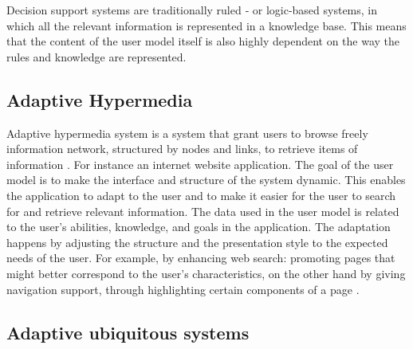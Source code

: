 Decision support systems are traditionally ruled ‐ or logic-based systems, in
which all the relevant information is represented in a knowledge base. This
means that the content of the user model itself is also highly dependent on the
way the rules and knowledge are represented.


\subsection{Adaptive Hypermedia}

Adaptive hypermedia system is a system that grant users to browse freely information
network,  structured by nodes and links, to retrieve items of information \cite{deepa2012adaptive}. For instance an internet website application.
The goal of the user model is to make the interface and structure of the system
dynamic. This enables the application to adapt to the user and to make it easier
for the user to search for and retrieve relevant information.  The data used in
the user model is related to the user’s abilities, knowledge, and goals in the
application. The adaptation happens by adjusting the structure and the
presentation style to the expected needs of the user. For example, by enhancing
web search: promoting pages that might better correspond to the user’s
characteristics, on the other hand by giving navigation support, through
highlighting certain components of a page \cite{razmerita2012user}.

\subsection{Adaptive ubiquitous systems}

